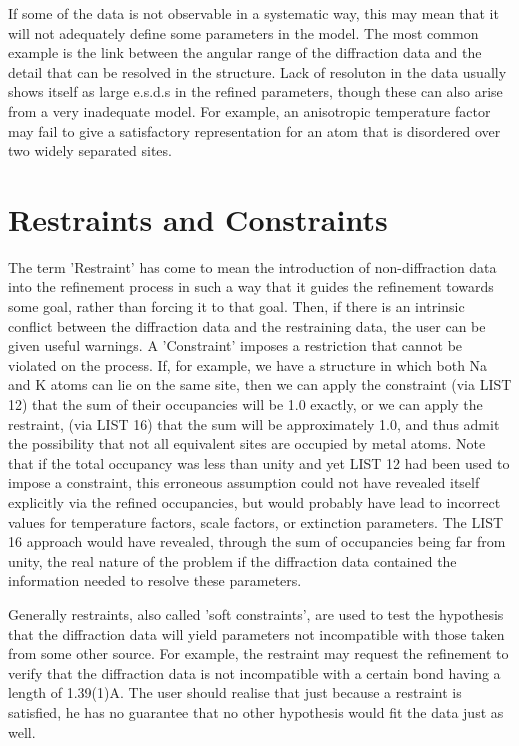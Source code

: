\documentclass[10pt,a4paper]{report}
\begin{document}
\bigskip{}




If some of the data is not observable in a systematic way, this may
 mean that it will not adequately define some parameters in the model. The
 most common example is the   link between the angular range of the diffraction
 data and the detail that can be resolved in the structure. Lack of resoluton
 in the data usually shows itself as large e.s.d.s in the refined parameters,
 though these can also arise from a very inadequate model. For example,
 an anisotropic temperature factor may fail to give a satisfactory
 representation for an atom that is disordered over two widely separated sites.



\section{Restraints and Constraints}
 The term 'Restraint' has come to mean the introduction of non-diffraction
 data into the refinement process in such a way that it guides the refinement
 towards some goal, rather than forcing it to that goal. Then, if there is
 an intrinsic conflict between the diffraction data and the restraining data,
 the user can be given useful warnings. A 'Constraint' imposes a restriction
 that cannot be violated on the process. If, for example, we have a structure
 in which both Na and K atoms can lie on the same site, then we can apply
 the constraint (via LIST 12) that the sum of their occupancies will be 1.0
 exactly, or we can apply the restraint, (via LIST 16) that the sum will be
 approximately 1.0, and thus admit the possibility that not all equivalent sites
 are 
 occupied by metal atoms. Note that if the total occupancy was less than unity
 and yet LIST 12 had been used to impose a constraint, this erroneous
 assumption could not have revealed itself explicitly via the refined
 occupancies, but would probably have lead to incorrect values for temperature
 factors, scale factors, or extinction parameters. The LIST 16 approach would
 have revealed, through the sum of occupancies being far from unity, the real
 nature of the problem if the diffraction data contained the information
 needed to resolve these parameters. 


Generally restraints, also called 'soft constraints', are used to test the
 hypothesis that the diffraction data will yield parameters not
 incompatible with those taken from some other source. For example, the
 restraint may request the refinement to verify that the diffraction data
 is not incompatible with a certain bond having a length of 1.39(1)A.
 The user should realise that just because a restraint is satisfied, he has
 no guarantee that no  other hypothesis would fit the data just as  well. 
\end{document}
